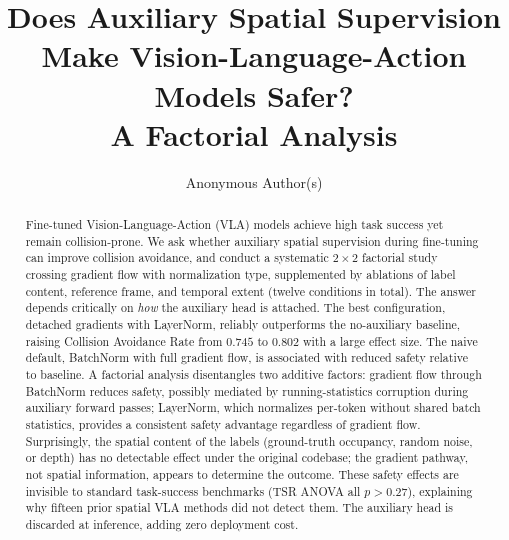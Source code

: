 \documentclass{article}
\title{Does Auxiliary Spatial Supervision Make Vision-Language-Action Models Safer?\\ A Factorial Analysis}
\author{
Anonymous Author(s)
}
\begin{document}
\maketitle

\begin{abstract}
Fine-tuned Vision-Language-Action (VLA) models achieve high task success yet remain collision-prone. We ask whether auxiliary spatial supervision during fine-tuning can improve collision avoidance, and conduct a systematic $2{\times}2$ factorial study crossing gradient flow with normalization type, supplemented by ablations of label content, reference frame, and temporal extent (twelve conditions in total). The answer depends critically on \emph{how} the auxiliary head is attached. The best configuration, detached gradients with LayerNorm, reliably outperforms the no-auxiliary baseline, raising Collision Avoidance Rate from $0.745$ to $0.802$ with a large effect size. The naive default, BatchNorm with full gradient flow, is associated with reduced safety relative to baseline. A factorial analysis disentangles two additive factors: gradient flow through BatchNorm reduces safety, possibly mediated by running-statistics corruption during auxiliary forward passes; LayerNorm, which normalizes per-token without shared batch statistics, provides a consistent safety advantage regardless of gradient flow. Surprisingly, the spatial content of the labels (ground-truth occupancy, random noise, or depth) has no detectable effect under the original codebase; the gradient pathway, not spatial information, appears to determine the outcome. These safety effects are invisible to standard task-success benchmarks (TSR ANOVA all $p{>}0.27$), explaining why fifteen prior spatial VLA methods did not detect them. The auxiliary head is discarded at inference, adding zero deployment cost.
\end{abstract}


















\clearpage
\appendix

\end{document}
